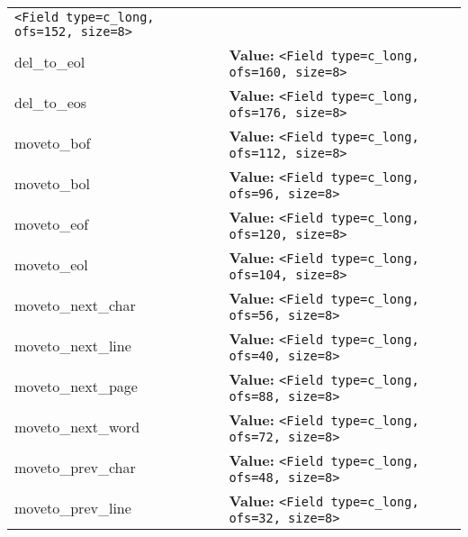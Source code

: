 \begin{longtable}{|p{\varnamewidth}|p{\vardescrwidth}|l}
{\tt {\textless}Field type=c\_long, ofs=152, size=8{\textgreater}}&\\
\cline{1-2}
\raggedright d\-e\-l\-\_\-t\-o\-\_\-e\-o\-l\- & \raggedright \textbf{Value:} 
{\tt {\textless}Field type=c\_long, ofs=160, size=8{\textgreater}}&\\
\cline{1-2}
\raggedright d\-e\-l\-\_\-t\-o\-\_\-e\-o\-s\- & \raggedright \textbf{Value:} 
{\tt {\textless}Field type=c\_long, ofs=176, size=8{\textgreater}}&\\
\cline{1-2}
\raggedright m\-o\-v\-e\-t\-o\-\_\-b\-o\-f\- & \raggedright \textbf{Value:} 
{\tt {\textless}Field type=c\_long, ofs=112, size=8{\textgreater}}&\\
\cline{1-2}
\raggedright m\-o\-v\-e\-t\-o\-\_\-b\-o\-l\- & \raggedright \textbf{Value:} 
{\tt {\textless}Field type=c\_long, ofs=96, size=8{\textgreater}}&\\
\cline{1-2}
\raggedright m\-o\-v\-e\-t\-o\-\_\-e\-o\-f\- & \raggedright \textbf{Value:} 
{\tt {\textless}Field type=c\_long, ofs=120, size=8{\textgreater}}&\\
\cline{1-2}
\raggedright m\-o\-v\-e\-t\-o\-\_\-e\-o\-l\- & \raggedright \textbf{Value:} 
{\tt {\textless}Field type=c\_long, ofs=104, size=8{\textgreater}}&\\
\cline{1-2}
\raggedright m\-o\-v\-e\-t\-o\-\_\-n\-e\-x\-t\-\_\-c\-h\-a\-r\- & \raggedright \textbf{Value:} 
{\tt {\textless}Field type=c\_long, ofs=56, size=8{\textgreater}}&\\
\cline{1-2}
\raggedright m\-o\-v\-e\-t\-o\-\_\-n\-e\-x\-t\-\_\-l\-i\-n\-e\- & \raggedright \textbf{Value:} 
{\tt {\textless}Field type=c\_long, ofs=40, size=8{\textgreater}}&\\
\cline{1-2}
\raggedright m\-o\-v\-e\-t\-o\-\_\-n\-e\-x\-t\-\_\-p\-a\-g\-e\- & \raggedright \textbf{Value:} 
{\tt {\textless}Field type=c\_long, ofs=88, size=8{\textgreater}}&\\
\cline{1-2}
\raggedright m\-o\-v\-e\-t\-o\-\_\-n\-e\-x\-t\-\_\-w\-o\-r\-d\- & \raggedright \textbf{Value:} 
{\tt {\textless}Field type=c\_long, ofs=72, size=8{\textgreater}}&\\
\cline{1-2}
\raggedright m\-o\-v\-e\-t\-o\-\_\-p\-r\-e\-v\-\_\-c\-h\-a\-r\- & \raggedright \textbf{Value:} 
{\tt {\textless}Field type=c\_long, ofs=48, size=8{\textgreater}}&\\
\cline{1-2}
\raggedright m\-o\-v\-e\-t\-o\-\_\-p\-r\-e\-v\-\_\-l\-i\-n\-e\- & \raggedright \textbf{Value:} 
{\tt {\textless}Field type=c\_long, ofs=32, size=8{\textgreater}}&\\

\end{longtable}
